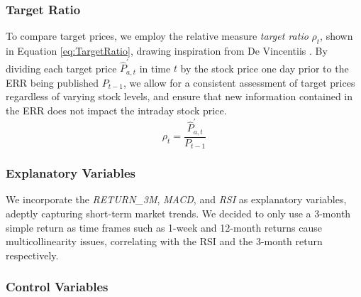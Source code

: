 \subsubsection{Target Ratio}


To compare target prices, we employ the relative measure \textit{target ratio} \(\rho_t\), shown in Equation \ref{eq:TargetRatio}, drawing inspiration from De Vincentiis \parencite*{de2010accuracy}. By dividing each target price \(\hat{P}_{a,t}^{'}\) in time \(t\) by the stock price one day prior to the ERR being published $P_{t-1}$, we allow for a consistent assessment of target prices regardless of varying stock levels, and ensure that new information contained in the ERR does not impact the intraday stock price. 
\begin{equation}
\label{eq:TargetRatio}
    \rho_t=\frac{\hat{P}_{a,t}^{'}}{P_{t-1}}
\end{equation}



\subsubsection{Explanatory Variables}

We incorporate the \textit{RETURN\_3M}, \textit{MACD}, and \textit{RSI} as explanatory variables, adeptly capturing short-term market trends. We decided to only use a 3-month simple return as time frames such as 1-week and 12-month returns cause multicollinearity issues, correlating with the RSI and the 3-month return respectively.

\subsubsection{Control Variables} \label{sec:controlvariables}

